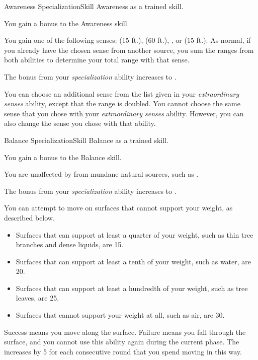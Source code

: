   \begin{feat}{Awareness Specialization}{Skill}
    \featpre Awareness as a trained skill.

     You gain a  bonus to the Awareness skill.

     You gain one of the following senses:  (15 ft.),  (60 ft.), , or  (15 ft.).
    As normal, if you already have the chosen sense from another source, you sum the ranges from both abilities to determine your total range with that sense.

     The bonus from your \textit{specialization} ability increases to .

     You can choose an additional sense from the list given in your \textit{extraordinary senses} ability, except that the range is doubled.
    You cannot choose the same sense that you chose with your \textit{extraordinary senses} ability.
    However, you can also change the sense you chose with that ability.
  \end{feat}

  \begin{feat}{Balance Specialization}{Skill}
    \featpre Balance as a trained skill.

     You gain a  bonus to the Balance skill.

     You are unaffected by  from mundane natural sources, such as .

     The bonus from your \textit{specialization} ability increases to .

     You can attempt to move on surfaces that cannot support your weight, as described below.
    \begin{itemize}
      \item Surfaces that can support at least a quarter of your weight, such as thin tree branches and dense liquids, are  15.
      \item Surfaces that can support at least a tenth of your weight, such as water, are  20.
      \item Surfaces that can support at least a hundredth of your weight, such as tree leaves, are  25.
      \item Surfaces that cannot support your weight at all, such as air, are  30.
    \end{itemize}

    Success means you move along the surface.
    Failure means you fall through the surface, and you cannot use this ability again during the current phase.
    The  increases by 5 for each consecutive round that you spend moving in this way.
  \end{feat}


